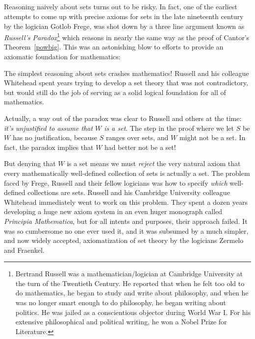 \subsection{}

Reasoning naively about sets turns out to be risky.  In fact, one of the
earliest attempts to come up with precise axioms for sets in the late
nineteenth century by the logician  Gotlob Frege, was
shot down by a three line argument known as \emph{Russell's
  Paradox}\footnote{Bertrand Russell%
was a mathematician/logician at Cambridge University at the turn of the Twentieth
 Century.  He reported that when he felt too old to do mathematics, he began to study
  and write about philosophy, and when he was no longer smart enough to do
  philosophy, he began writing about politics.  He was jailed as a
  conscientious objector during World War I.  For his extensive
  philosophical and political writing, he won a Nobel Prize for
  Literature.} which reasons in nearly the same way as the proof of
Cantor's Theorem~\ref{powbig}.  This was an astonishing blow to efforts to
provide an axiomatic foundation for mathematics:


The simplest reasoning about sets crashes mathematics!  Russell and his
colleague Whitehead spent years trying to develop a set theory that was
not contradictory, but would still do the job of serving as a solid
logical foundation for all of mathematics.

Actually, a way out of the paradox was clear to Russell and others at
the time: \emph{it's unjustified to assume that $W$ is a set}.  The
step in the proof where we let $S$ be $W$ has no justification,
because $S$ ranges over sets, and $W$ might not be a set.  In fact, the
paradox implies that $W$ had better not be a set!

But denying that $W$ is a set means we must \emph{reject} the very
natural axiom that every mathematically well-defined collection of
sets is actually a set.  The problem faced by Frege, Russell and their
fellow logicians was how to specify \emph{which} well-defined
collections are sets.  Russell and his Cambridge University colleague
Whitehead immediately went to work on this problem.  They spent a
dozen years developing a huge new axiom system in an even huger
monograph called \emph{Principia Mathematica}, but for all intents and
purposes, their approach failed.  It was so cumbersome no one ever
used it, and it was subsumed by a much simpler, and now widely
accepted, axiomatization of set theory by the logicians Zermelo
and Fraenkel.

